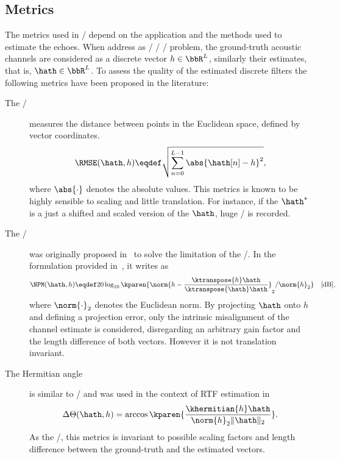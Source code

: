 \subsection{Metrics}
The metrics used in \AER/ depend on the application and the methods used to estimate the echoes.
When address as \FIR/ \SIMO/ \BCE/ problem, the ground-truth acoustic channels are considered as a discrete vector $h \in \bbR^L$, similarly their estimates, that is, $\hath \in \bbR^L$.
To assess the quality of the estimated discrete filters the following metrics have been proposed in the literature:
\begin{description}
    \item[The \RMSEtxt/] measures the distance between points in the Euclidean space, defined by vector coordinates.
    \begin{equation}
        \RMSE(\hath, h) \eqdef \sqrt{\sum_{n=0}^{L-1} \abs{\hath[n] - h}^2}
        ,
    \end{equation}
    where $\abs{\cdot}$ denotes the absolute values.
    This metrics is known to be highly sensible to scaling and little translation.
    For instance, if the $\hath^{*}$ is a just a shifted and scaled version of the $\hath$, huge \RMSEtxt/ is recorded.

    \item[The \NPMtxt/] was originally proposed in~ to solve the limitation of the \RMSEtxt/.
    In the formulation provided in~, it writes as
    \begin{equation}
        \NPM(\hath,h) \eqdef 20 \log_{10} \kparen{ \norm{h - \frac{\ktranspose{h}\hath}{\ktranspose{\hath} \hath}}_2 / \norm{h}_2} \quad \text{[dB]}
        ,
    \end{equation}
    where $\norm{\cdot}_2$ denotes the Euclidean norm.
    By projecting $\hath$ onto $h$ and defining a projection error, only the intrinsic misalignment of the channel estimate is considered, disregarding an arbitrary gain factor and the length difference of both vectors.
    However it is not translation invariant.

    \item[The Hermitian angle] is similar to \NPMtxt/ and was used in the context of RTF estimation in~
    \begin{equation}
        \Delta\Theta(\hath,h) = \arccos\kparen{\frac{\khermitian{h}\hath}{\norm{h}_2\|\hath\|_2}}
        .
    \end{equation}
    As the \NPMtxt/, this metrics is invariant to possible scaling factors and length difference between the ground-truth and the estimated vectors.
\end{description}


